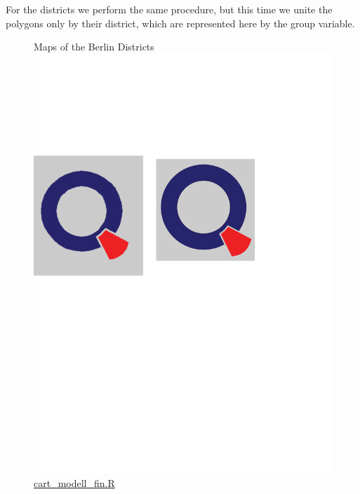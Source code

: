 For the districts we perform the same procedure, but this time we unite the polygons only by their district, which are represented here by the group variable.


\begin{figure}[H]
\centering
{}
\caption{Maps of the Berlin Districts \protect\includegraphics[scale=0.05]{qletlogo.pdf} {\href{https://github.com/thsis/SPL_WS1718/blob/master/CART/cart_modell_fin.R}{cart\_modell\_fin.R}}}
\centering
\end{figure}

